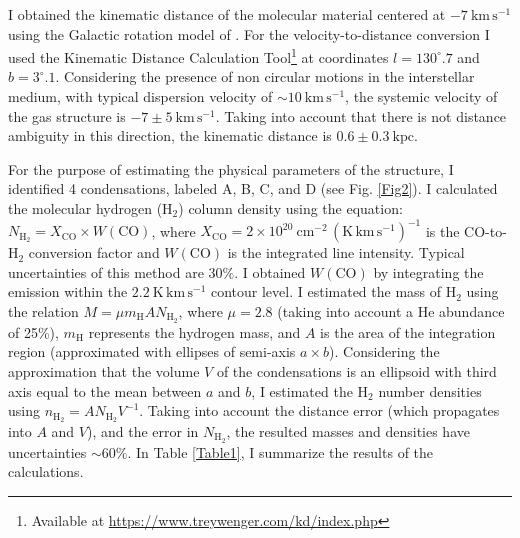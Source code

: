 \documentclass[baaa]{baaa}
\begin{document}
I obtained the kinematic distance of the molecular material centered at $-7~\mathrm{km\,s^{-1}}$ using the Galactic rotation model of \cite{reid13}. For the velocity-to-distance conversion I used the Kinematic Distance Calculation Tool\footnote{Available at \url{https://www.treywenger.com/kd/index.php}} at coordinates $l = 130^{\circ}.7$ and $b=3^{\circ}.1$.
Considering the presence of non circular motions in the interstellar medium, with typical dispersion velocity of $\sim 10~\mathrm{km\,s^{-1}}$, the systemic velocity of the gas structure is $-7\pm5~\mathrm{km\,s^{-1}}$. Taking into account that there is not distance ambiguity in this direction, the kinematic distance is $0.6\pm0.3~\mathrm{kpc}$.

For the purpose of estimating the physical parameters of the structure, I identified 4 condensations, labeled A, B, C, and D (see Fig. \ref{Fig2}). I calculated the molecular hydrogen (H$_2$) column density using the equation: $N_{\mathrm{H_2}}= X_{\mathrm{CO}} \times W(\mathrm{CO})$, where $X_{\mathrm{CO}} = 2 \times 10^{20}~\mathrm{cm^{-2}\,(K\,km\,s^{-1})^{-1}}$ is the CO-to-H$_2$ conversion factor and $W(\mathrm{CO})$ is the integrated line intensity. Typical uncertainties of this method are $30\%$\citep{bolatto13}.
I obtained $W(\mathrm{CO})$ by integrating the emission within the $2.2~\mathrm{K\,km\,s^{-1}}$ contour level. I estimated the mass of H$_2$ using the relation $M = \mu m_{\mathrm H} A N_{\mathrm{H_2}}$, where $\mu = 2.8$ (taking into account a He abundance of 25\%), $m_{\mathrm H}$ represents the hydrogen mass, and $A$ is the area of the integration region (approximated with ellipses of semi-axis $a \times b$). Considering the approximation that the volume $V$ of the condensations is an ellipsoid with third axis equal to the mean between $a$ and $b$, I estimated the H$_2$ number densities using $n_{\mathrm{H_2}} = A N_{\mathrm{H_2}} V^{-1}$. 
Taking into account the distance error (which propagates into $A$ and $V$), and the error in $N_{\mathrm{H_2}}$, the resulted masses and densities have uncertainties $\sim 60\%$.
In Table \ref{Table1}, I summarize the results of the calculations.
\end{document}

